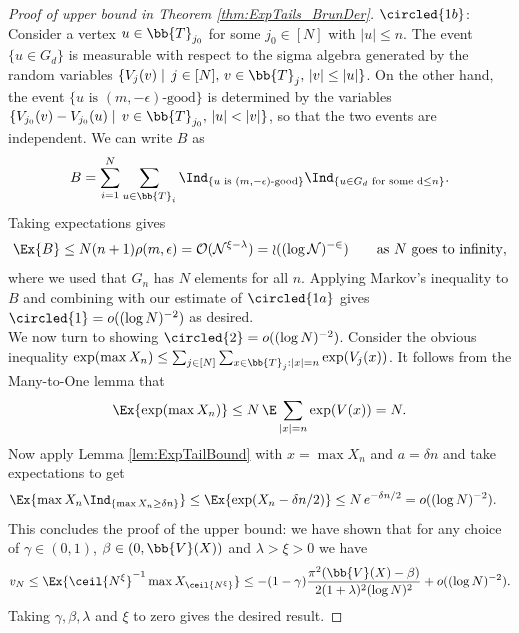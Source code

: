 \begin{proof}[Proof of upper bound in Theorem \ref{thm:ExpTails_BrunDer}]
$\circled{1b}$: Consider a vertex $u \in \bb{T}_{j_0}$ for some $j_0 \in [N]$ with $|u| \leq n$. The event $\{u \in G_d\}$ is measurable with respect to the sigma algebra generated by the random variables $\{ V_j(v) \mid\, j \in [N],\, v \in \bb{T}_j,\, |v| \leq |u|\}$. On the other hand, the event $\{ u \text{ is }(m, - \epsilon) \text{-good}\}$ is determined by the variables $\{ V_{j_0}(v) - V_{j_0}(u) \mid\, v \in \bb{T}_{j_0},\, |u| < |v| \}$, so that the two events are independent. We can write $B$ as 
\begin{equation*}
B = \sum\limits_{i=1}^N \sum\limits_{u \in \bb{T}_i} \Ind_{\{u \text{ is } (m, - \epsilon)\text{-good}\}} \Ind_{\{u \in G_d \text{ for some d} \leq n \}}. 
\end{equation*}
Taking expectations gives 
\begin{equation}
\Ex{B} \leq N(n+1)\rho(m, \epsilon) = \cal{O}(N^{\xi -\lambda}) = o((\log N)^{-2}) \qquad\text{as $N$ goes to infinity}, 
\end{equation}
where we used that $G_n$ has $N$ elements for all $n$. Applying Markov's inequality to $B$ and combining with our estimate of $\circled{1a}$ gives $\circled{1} = o((\log N)^{-2})$ as desired. \\

We now turn to showing $\circled{2} = o((\log N)^{-2})$. Consider the obvious inequality $\exp(\max X_n) \leq \sum_{j \in [N]} \sum_{x \in \bb{T}_j : |x| = n} \exp(V_j(x))$. It follows from the Many-to-One lemma that 
\begin{align}
\Ex{\exp(\max X_n)} \leq N\, \E\sum\limits_{|x| = n} \exp(V(x)) = N. 
\end{align}
Now apply Lemma \ref{lem:ExpTailBound} with $x = \max X_n$ and $a = \delta n$ and take expectations to get 
\begin{align*}
\Ex{\max X_n \Ind_{\{\max X_n \geq \delta n \}}} &\leq \Ex{\exp(X_n - \delta n / 2)} \leq N \, e^{-\delta n / 2} = o((\log N)^{-2}).
\end{align*}
This concludes the proof of the upper bound: we have shown that for any choice of $\gamma \in (0,1)$, $\beta \in (0, \bb{V}(X))$ and $\lambda > \xi > 0$ we have
\begin{equation}\label{eqn:ExpTailResultTally}
v_N \leq \Ex{\ceil{N^\xi}^{-1} \max X_{\ceil{N^\xi}}} \leq - (1 - \gamma) \frac{\pi^2 (\bb{V}(X) - \beta)}{2 (1 + \lambda)^2(\log N)^2} + o((\log N)^{-2}). 
\end{equation}
Taking $\gamma, \beta, \lambda$ and $\xi$ to zero gives the desired result. 
\end{proof}











